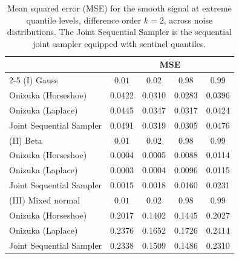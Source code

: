 \begin{table}[htbp]
\centering
\caption{Mean squared error (MSE) for the smooth signal at extreme quantile levels, difference order $k = 2$, across noise distributions. The Joint Sequential Sampler is the sequential joint sampler equipped with sentinel quantiles.}
\label{tab:s_ext_mse}
\begin{tabular}{lcccc}
\toprule
& \multicolumn{4}{c}{MSE} \\
\cmidrule(lr){2-5}
(I) Gauss & $0.01$ & $0.02$ & $0.98$ & $0.99$ \\
\midrule
Onizuka (Horseshoe)      & 0.0422 & 0.0310 & 0.0283 & 0.0396 \\
Onizuka (Laplace)        & 0.0445 & 0.0347 & 0.0317 & 0.0424 \\
Joint Sequential Sampler & 0.0491 & 0.0319 & 0.0305 & 0.0476 \\
\midrule
(II) Beta & $0.01$ & $0.02$ & $0.98$ & $0.99$ \\
\midrule
Onizuka (Horseshoe)      & 0.0004 & 0.0005 & 0.0088 & 0.0114 \\
Onizuka (Laplace)        & 0.0003 & 0.0004 & 0.0096 & 0.0115 \\
Joint Sequential Sampler & 0.0015 & 0.0018 & 0.0160 & 0.0231 \\
\midrule
(III) Mixed normal & $0.01$ & $0.02$ & $0.98$ & $0.99$ \\
\midrule
Onizuka (Horseshoe)      & 0.2017 & 0.1402 & 0.1445 & 0.2027 \\
Onizuka (Laplace)        & 0.2376 & 0.1652 & 0.1726 & 0.2414 \\
Joint Sequential Sampler & 0.2338 & 0.1509 & 0.1486 & 0.2310 \\
\bottomrule
\end{tabular}
\end{table}

